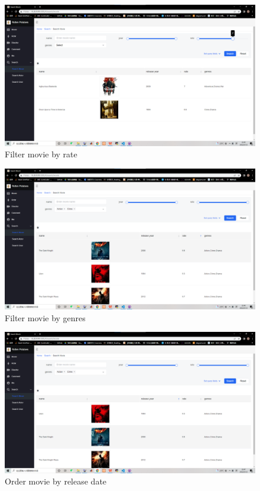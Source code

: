 \begin{CJK*}{UTF8}{gbsn}
    \begin{figure}[htbp]
    \centering
    \includegraphics[width=1\textwidth]{res_search4.png}
    \caption{Filter movie by rate}
    \end{figure}
    
    \begin{figure}[htbp]
    \centering
    \includegraphics[width=1\textwidth]{res_search5.png}
    \caption{Filter movie by genres}
    \end{figure}
    
    \begin{figure}[htbp]
    \centering
    \includegraphics[width=1\textwidth]{res_search6.png}
    \caption{Order movie by release date}
    \end{figure}
    

\end{CJK*}
